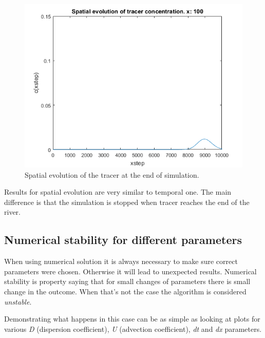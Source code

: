 \documentclass[12pt]{article}
\begin{document}
\begin{figure}[H]
	\centering
	\includegraphics[width=\textwidth]{spatial3}
	{{\small Spatial evolution of the tracer at the end of simulation.}}    
\end{figure}

Results for spatial evolution are very similar to temporal one. The main difference is that the simulation is stopped when tracer reaches the end of the river.

\subsection{Numerical stability for different parameters}

When using numerical solution it is always necessary to make sure correct parameters were chosen. Otherwise it will lead to unexpected results. Numerical stability is property saying that for small changes of parameters there is small change in the outcome. When that's not the case the algorithm is considered \textit{unstable}.

Demonstrating what happens in this case can be as simple as looking at plots for various \textit{D} (dispersion coefficient), \textit{U} (advection coefficient), \textit{dt} and \textit{dx} parameters.
\end{document}
